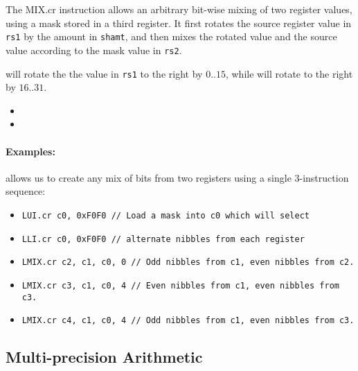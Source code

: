 {\ienclmixcr\ienchmixcr}
{
The MIX.cr instruction allows an arbitrary bit-wise mixing of two
register values, using a mask stored in a third register.
It first rotates  the source register value in {\tt rs1} by the amount in
{\tt shamt}, and then mixes the rotated value and the source value according
to the mask value in {\tt rs2}.

 will rotate the the value in {\tt rs1} to the right by $0..15$,
while  will rotate to the right by $16..31$. 
}{
\begin{itemize}
\item {}
\item {}
\end{itemize}
}{
\paragraph{Examples:}
 allows us to create any mix of bits from two registers
using a single 3-instruction sequence:

\begin{itemize}
\item{\tt LUI.cr   c0, 0xF0F0     // Load a mask into c0 which will select}
\item{\tt LLI.cr   c0, 0xF0F0     // alternate nibbles from each register}
\item{\tt LMIX.cr  c2, c1, c0, 0  // Odd nibbles from c1, even nibbles from c2.}
\item{\tt LMIX.cr  c3, c1, c0, 4  // Even nibbles from c1, even nibbles from c3.}
\item{\tt LMIX.cr  c4, c1, c0, 4  // Odd  nibbles from c1, even nibbles from c3.}
\end{itemize}
}

\subsection{Multi-precision Arithmetic}
\label{sec:multi-precision-instructions}

